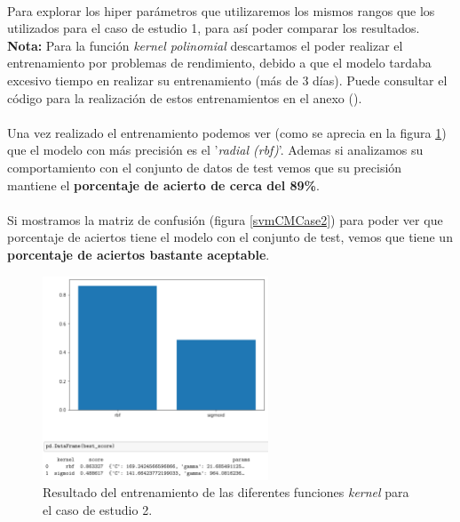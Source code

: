 {\paragraph{}
Para explorar los hiper parámetros que utilizaremos los mismos rangos que los utilizados para el caso de estudio 1, para así poder comparar los resultados. \textbf{Nota:} Para la función \textit{kernel polinomial} descartamos el poder realizar el entrenamiento por problemas de rendimiento, debido a que el modelo tardaba excesivo tiempo en realizar su entrenamiento (más de 3 días). Puede consultar el código para la realización de estos entrenamientos en el anexo ().

\paragraph{}
Una vez realizado el entrenamiento podemos ver (como se aprecia en la figura \ref{svmTrainCase2}) que el modelo con más precisión es el '\textit{radial (rbf)}'. Ademas si analizamos su comportamiento con el conjunto de datos de test vemos que su precisión mantiene el \textbf{porcentaje de acierto de cerca del 89\%}.

\paragraph{}
Si mostramos la matriz de confusión\cite{ref:confusion_matrix} (figura \ref{svmCMCase2}) para poder ver que porcentaje de aciertos tiene el modelo con el conjunto de test, vemos que tiene un \textbf{porcentaje de aciertos bastante aceptable}.

\begin{figure}[!htb]
  \centering
	    \includegraphics[width=0.6\textwidth]{images/resultados_svm_ent_conjunto2.png}
    	\caption{Resultado del entrenamiento de las diferentes funciones \textit{kernel} para el caso de estudio 2.}
	\label{svmTrainCase2}
\end{figure}

}
